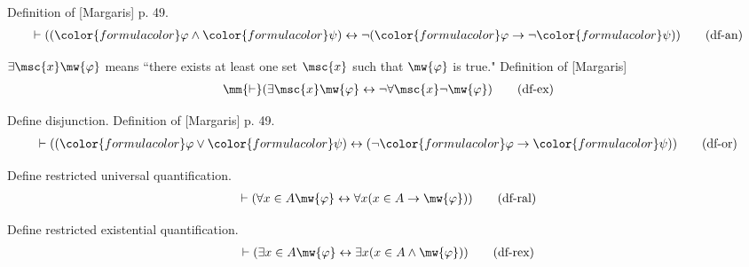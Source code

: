 
\begin{metadefinition}  Definition
of [Margaris] p. 49.  
\begin{align}
\vdash ( ( {\color{formulacolor}\varphi} \wedge {\color{formulacolor}\psi} )
    \leftrightarrow \lnot ( {\color{formulacolor}\varphi} \rightarrow \lnot
    {\color{formulacolor}\psi} ) )\label{eq:df-an}\tag{df-an}
\end{align}
\end{metadefinition}


\begin{metadefinition}
$\exists \msc{x} \mw{\varphi}$ means ``there exists at
     least one set $\msc{x}$ such that $\mw{\varphi}$ is true."  Definition of
[Margaris]
\begin{align}
\mm{\vdash} ( \exists \msc{x} \mw{\varphi} \leftrightarrow \lnot \forall
    \msc{x} \lnot \mw{\varphi} )\label{eq:df-ex}\tag{df-ex}
\end{align}
\end{metadefinition}


\begin{metadefinition} {Define disjunction.}  Definition
of [Margaris] p. 49.  
\begin{align}
\vdash ( ( {\color{formulacolor}\varphi} \vee {\color{formulacolor}\psi} )
    \leftrightarrow ( \lnot {\color{formulacolor}\varphi} \rightarrow
    {\color{formulacolor}\psi} ) )\label{df-or}\tag{df-or}
\end{align}
\end{metadefinition}


\begin{metadefinition} {Define restricted universal
quantification.}
\begin{align}
\vdash ( \forall x \in A \mw{\varphi} \leftrightarrow \forall x ( x \in A
    \rightarrow \mw{\varphi} ) )\label{eq:df-ral}\tag{df-ral}
\end{align}
\end{metadefinition}


\begin{metadefinition} {Define restricted existential
quantification.}
\begin{align}
\vdash ( \exists x \in A \mw{\varphi} \leftrightarrow \exists x ( x \in A
    \wedge \mw{\varphi} ) )\label{eq:df-rex}\tag{df-rex}
\end{align}
\end{metadefinition}



